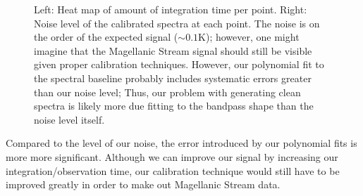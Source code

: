\documentclass[12pt]{article}
\begin{document}
\begin{figure}[H]
\caption[SODUMB]{Left: Heat map of amount of integration time per point. Right: Noise level of the calibrated spectra at each point. The noise is on the order of the expected signal ($\sim 0.1\mathrm{K}$); however, one might imagine that the Magellanic Stream signal should still be visible given proper calibration techniques. However, our polynomial fit to the spectral baseline probably includes systematic errors greater than our noise level; Thus, our problem with generating clean spectra is likely more due fitting to the bandpass shape than the noise level itself.
}
\label{fig:noises}
\end{figure}

Compared to the level of our noise, the error introduced by our polynomial fits is more more significant. Although we can improve our signal by increasing our integration/observation time, our calibration technique would still have to be improved greatly in order to make out Magellanic Stream data.
\end{document}
